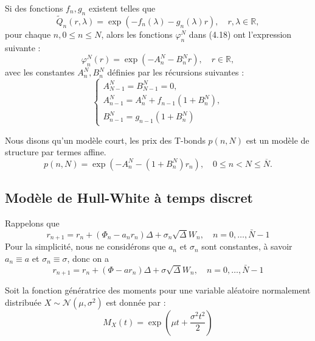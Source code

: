 Si des fonctions \( f_n, g_n \) existent telles que
\begin{equation}
\tilde{Q}_n(r, \lambda) = \exp(-f_n(\lambda) - g_n(\lambda)r), \quad r, \lambda \in \mathbb{R},
\label{eq:my_equation_2.8}
\end{equation}
pour chaque \( n, 0 \leq n \leq N \), alors les fonctions \( \varphi_n^N \) dans (4.18) ont l'expression suivante :
\begin{equation}
\varphi_n^N (r) = \exp(-A_n^N - B_n^N r), \quad r \in \mathbb{R},
\label{eq:my_equation_2.9}
\end{equation}
avec les constantes \( A_n^N, B_n^N \) définies par les récursions suivantes :
\begin{equation}
\begin{cases}
    A_{N-1}^N=B_{N-1}^N=0, \\
    A_{n-1}^N=A_n^N+f_{n-1}\left(1+B_n^N\right), \\
    B_{n-1}^N=g_{n-1}\left(1+B_n^N\right) 
\end{cases}    
\end{equation}

\begin{defn}
    Nous disons qu'un modèle court, les prix des T-bonds $p(n,N)$ est un modèle de structure par termes affine.
    \begin{equation}
    p(n, N) = \exp(-A_n^N - (1 + B_n^N) r_n), \quad 0 \leq n < N \leq \overline{N}.
    \label{eq:my_equation_2.11}
    \end{equation}
    
\end{defn}

\subsection{Modèle de Hull-White à temps discret}

Rappelons que 
\begin{equation}
    r_{n+1} = r_n + (\Phi_n - a_n r_n) \Delta + \sigma_n \sqrt{\Delta} W_n, \quad n = 0, \ldots, \bar{N} - 1
\end{equation}
Pour la simplicité, nous ne considérons que $a_n$ et $\sigma_n$ sont constantes, à savoir $a_n \equiv a $ et $ \sigma_n \equiv \sigma$, donc on a 
\begin{equation}
    r_{n+1} = r_n + (\Phi - a r_n) \Delta + \sigma \sqrt{\Delta} W_n, \quad n = 0, \ldots, \bar{N} - 1
\end{equation}

Soit la fonction génératrice des moments pour une variable aléatoire normalement distribuée \( X \sim \mathcal{N}(\mu, \sigma^2) \) est donnée par :
\begin{equation}
M_X(t) = \exp\left(\mu t + \frac{\sigma^2 t^2}{2}\right)
\end{equation}


